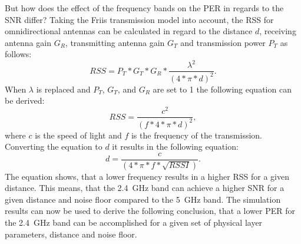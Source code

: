 But how does the effect of the frequency bands on the \ac{PER} in regards to the \ac{SNR} differ?
Taking the Friis transmission model \cite{shaw_radiometry_2013} into account, the \ac{RSS} for omnidirectional antennas can be calculated in regard to the distance $d$,
receiving antenna gain $G_{R}$, transmitting antenna gain $G_{T}$ and transmission power $P_{T}$  as follows:
\begin{equation}
	RSS = P_{T} * G_{T} * G_{R} * \frac{\lambda^2}{(4 * \pi * d)^2}.
\end{equation}
When $\lambda$ is replaced and  $P_{T}$,  $G_{T}$,  and $G_{R}$ are set to \num{1} the following equation can be derived:
\begin{equation}
	RSS = \frac{c^2}{(f* 4 * \pi * d)^2},
\end{equation}
where $c$ is the speed of light and $f$ is the frequency of the transmission.
Converting the equation to $d$ it results in the following equation:
\begin{equation}
	d = \frac{c}{(4 * \pi * f * \sqrt {RSSI})}.
\end{equation}
The equation shows, that a lower frequency results in a higher \ac{RSS} for a given distance.
This means, that the \SI{2.4}{\giga\hertz} band can achieve a higher \ac{SNR} for a given distance and noise floor
compared to the \SI{5}{\giga\hertz} band.
The simulation results can now be used to derive the following conclusion,
that a lower \ac{PER} for the \SI{2.4}{\giga\hertz} band can be accomplished
for a given set of physical layer parameters, distance and noise floor.


